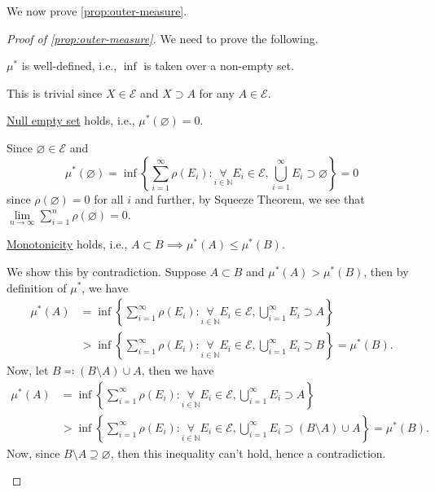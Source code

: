 We now prove \autoref{prop:outer-measure}.
\begin{proof}[Proof of \autoref{prop:outer-measure}]
	We need to prove the following.

	\begin{claim}
		\(\mu ^{\ast} \) is well-defined, i.e., \(\inf\) is taken over a non-empty set.
	\end{claim}
	\begin{explanation}
		This is trivial since \(X\in \mathcal{E}\) and \(X\supset A\) for any \(A\in \mathcal{E}\).
	\end{explanation}

	\begin{claim}
		\hyperref[def:outer-measure-null-empty-set]{Null empty set} holds, i.e., \(\mu ^{\ast} (\varnothing ) = 0\).
	\end{claim}
	\begin{explanation}
		Since \(\varnothing \in \mathcal{E}\) and
		\[
			\mu^{\ast} (\varnothing ) = \inf \left\{\sum\limits_{i=1}^{\infty} \rho(E_{i})\colon \underset{i\in \mathbb{N} }{\forall}E_{i}\in \mathcal{E} , \bigcup\limits_{i=1}^{\infty} E_{i}\supset \varnothing \right\} = 0
		\]
		since \(\rho(\varnothing ) = 0\) for all \(i\) and further, by Squeeze Theorem, we see that \(\lim\limits_{n \to \infty} \sum\limits_{i=1}^{n} \rho(\varnothing) = 0\).
	\end{explanation}

	\begin{claim}
		\hyperref[def:outer-measure-montonicity]{Monotonicity} holds, i.e., \(A\subset B\implies \mu^{\ast} (A)\leq \mu^{\ast} (B)\).
	\end{claim}
	\begin{explanation}
		We show this by contradiction. Suppose \(A\subset B\) and \(\mu^{\ast} (A)>  \mu^{\ast} (B)\), then by
		definition of \(\mu^{\ast} \), we have
		\[
			\begin{split}
				\mu^{\ast} (A) &= \inf\left\{\sum\limits_{i=1}^{\infty} \rho(E_{i})\colon \underset{i\in\mathbb{N}}{\forall}E_{i}\in \mathcal{E},\bigcup\limits_{i=1}^{\infty} E_{i}\supset A \right\}\\
				&>\inf\left\{\sum\limits_{i=1}^{\infty} \rho(E_{i})\colon \underset{i\in\mathbb{N}}{\forall}E_{i}\in \mathcal{E},\bigcup\limits_{i=1}^{\infty} E_{i}\supset B \right\} = \mu^{\ast} (B).
			\end{split}
		\]
		Now, let \(B \eqqcolon (B\setminus A)\cup A\), then we have
		\[
			\begin{split}
				\mu^{\ast} (A) &= \inf\left\{\sum\limits_{i=1}^{\infty} \rho(E_{i})\colon \underset{i\in\mathbb{N}}{\forall}E_{i}\in \mathcal{E},\bigcup\limits_{i=1}^{\infty} E_{i}\supset A \right\}\\
				&>\inf\left\{\sum\limits_{i=1}^{\infty} \rho(E_{i})\colon \underset{i\in\mathbb{N}}{\forall}E_{i}\in \mathcal{E},\bigcup\limits_{i=1}^{\infty} E_{i}\supset (B\setminus A)\cup A \right\} = \mu^{\ast} (B).
			\end{split}
		\]
		Now, since \(B\setminus A\supseteq \varnothing \), then this inequality can't hold, hence a contradiction\conta.
	\end{explanation}


\end{proof}
